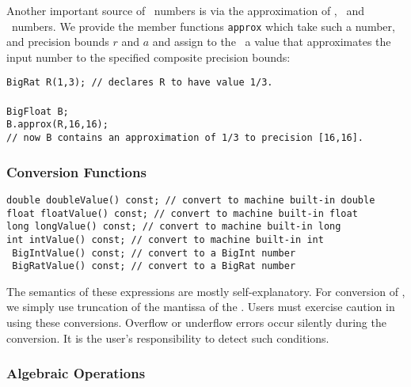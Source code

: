Another important source of \BF\ numbers is via
the approximation of \Int, \BF\ and \Rat\ numbers.  We provide
the member functions {\tt approx} which take such a number, 
and precision bounds $r$ and $a$ and assign to the \BF\ a value
that approximates the input number to the specified composite
precision bounds:

\nopagebreak
\begin{progb}{
\> \tt BigRat R(1,3); // declares {\tt R} to have value 1/3. \\
\\ 
\> \tt BigFloat B; \\
\> \tt B.approx(R,16,16); \\
\> \tt // now {\tt B} contains an approximation of 1/3 to precision [16,16].\\
}\end{progb}

\subsubsection{Conversion Functions}
\label{sec-bigfloat-cast}
\begin{progb} {
\> \tt 	 double doubleValue() const; \>\>\>\>\>\>\> // convert to machine built-in double\\
\> \tt 	 float  floatValue()  const; \>\>\>\>\>\>\> // convert to machine built-in float\\
\> \tt 	 long   longValue()   const; \>\>\>\>\>\>\> // convert to machine built-in long\\
\> \tt 	 int    intValue()    const; \>\>\>\>\>\>\> // convert to machine built-in int\\
\> \tt 	 \Int\  BigIntValue() const; \>\>\>\>\>\>\> // convert to a BigInt number\\
\> \tt 	 \Rat\  BigRatValue() const; \>\>\>\>\>\>\> // convert to a BigRat number\\
}\end{progb}

The semantics of these expressions are mostly self-explanatory.
For conversion of \Int, we simply use truncation of the mantissa of the \BF.
Users must exercise caution in using these conversions. 
Overflow or underflow errors occur silently during the conversion. 
It is the user's responsibility to detect such conditions.

\subsubsection{Algebraic Operations}


